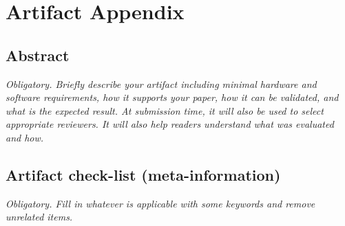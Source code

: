 \documentclass[letterpaper,twocolumn,10pt]{article}
\begin{document}


\appendix
\section{Artifact Appendix}

%

\subsection{Abstract}

{\em Obligatory. Briefly describe your artifact including minimal hardware and software requirements, how it supports your paper, how it can be validated, and what is the expected result. At submission time, it will also be used to select appropriate reviewers. It will also help readers understand what was evaluated and how.}

\subsection{Artifact check-list (meta-information)}

{\em Obligatory. Fill in whatever is applicable with some keywords and remove unrelated items.}
\end{document}
